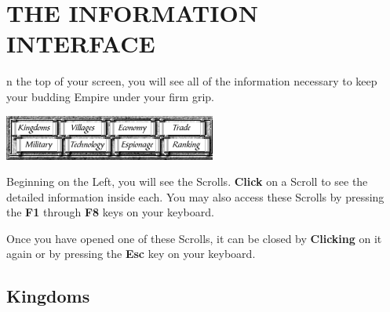 
\chapter{\textsf{\textbf{THE INFORMATION INTERFACE}}}


n the top of your screen, you will see all of the information necessary to keep your budding Empire under your firm grip.

\begin{center}
    \includegraphics[width=0.6\linewidth]{Iscrolls} %
\end{center}


Beginning on the Left, you will see the Scrolls. \textbf{Click} on a Scroll to see the detailed information inside each. You may also access these Scrolls by pressing the \textbf{F1} through \textbf{F8} keys on your keyboard.

Once you have opened one of these Scrolls, it can be closed by \textbf{Clicking} on it again or by pressing the \textbf{Esc} key on your keyboard.

\section{\textsf{Kingdoms}}



